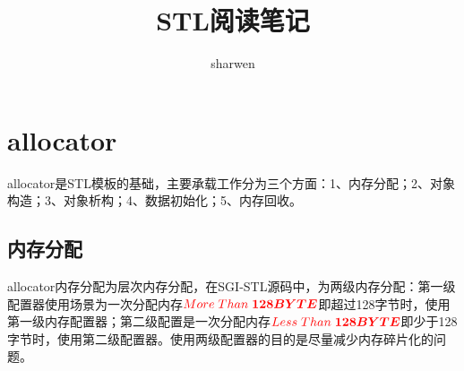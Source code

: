 \documentclass[a4paper,fontset=mac]{ctexart}
\title{STL阅读笔记}
\author{sharwen}
\date{}
\newcommand{\sanhao}{\fontsize{15.75pt}{\baselineskip}\selectfont}  %
\begin{document}
%	
%	
%	
%
	\maketitle
	\tableofcontents
%		
	\newpage%
	
	\section{allocator}
		allocator是STL模板的基础，主要承载工作分为三个方面：1、内存分配；2、对象构造；3、对象析构；4、数据初始化；5、内存回收。
		\subsection{内存分配}
			allocator内存分配为层次内存分配，在SGI-STL源码中，为两级内存分配：第一级配置器使用场景为一次分配内存$\color{red}{More \; Than\;}\boldsymbol{128BYTE}$即超过128字节时，使用第一级内存配置器；第二级配置是一次分配内存$\color{red}{Less \; Than\;}\boldsymbol{128BYTE}$即少于128字节时，使用第二级配置器。使用两级配置器的目的是尽量减少内存碎片化的问题。
		
\end{document}
